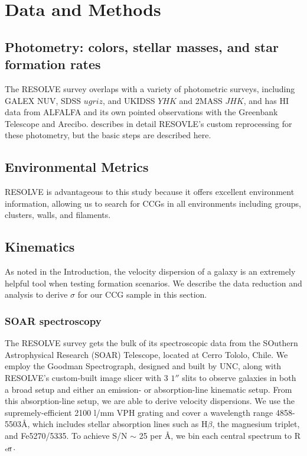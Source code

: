 \documentclass[iop,apj,twocolappendix]{emulateapj}
\newcommand{\Reff}{R$_{\rm eff}$}
\begin{document}
\section{Data and Methods}
\label{methods}

\subsection{Photometry: colors, stellar masses, and star formation rates}
\label{phot}
\noindent The RESOLVE survey overlaps with a variety of photometric surveys, including GALEX NUV, SDSS $ugriz$, and UKIDSS $YHK$ and 2MASS $JHK$, and has HI data from ALFALFA and its own pointed observations with the Greenbank Telescope and Arecibo. \citet{Eckert2015} describes in detail RESOVLE's custom reprocessing for these photometry, but the basic steps are described here.

\subsection{Environmental Metrics}
\label{env}
\noindent RESOLVE is advantageous to this study because it offers excellent environment information, allowing us to search for CCGs in all environments including groups, clusters, walls, and filaments. \citet{Moffett2015} 

\subsection{Kinematics}
\label{kin}

\noindent As noted in the Introduction, the velocity dispersion of a galaxy is an extremely helpful tool when testing formation scenarios. We describe the data reduction and analysis to derive $\sigma$ for our CCG sample in this section. 

\subsubsection{SOAR spectroscopy}
\noindent The RESOLVE survey gets the bulk of its spectroscopic data from the SOuthern Astrophysical Research (SOAR) Telescope, located at Cerro Tololo, Chile. We employ the Goodman Spectrograph, designed and built by UNC, along with RESOLVE's custom-built image slicer with 3 $1''$ slits to observe galaxies in both a broad setup and either an emission- or absorption-line kinematic setup. From this absorption-line setup, we are able to derive velocity dispersions. We use the supremely-efficient 2100 l/mm VPH grating and cover a wavelength range 4858-5503\AA, which includes stellar absorption lines such as H$\beta$, the magnesium triplet, and Fe5270/5335. To achieve S/N $\sim$ 25 per \AA, we bin each central spectrum to \Reff.
\end{document}
